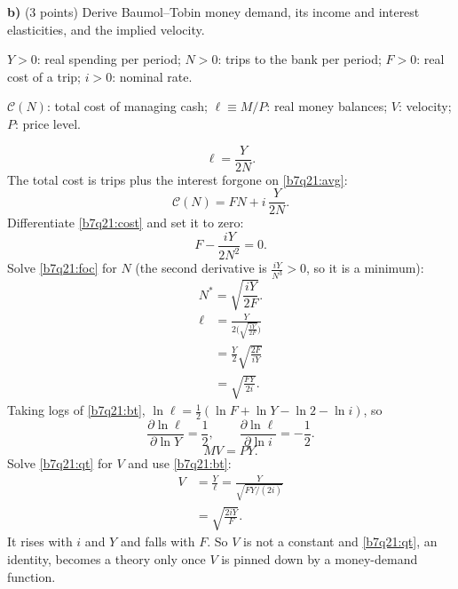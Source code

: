 \textbf{b)} (3 points) Derive Baumol--Tobin money demand, its income and interest elasticities, and the implied velocity.
\resolespaco
\begin{sol}
\begin{notacao}
\item $Y>0$: real spending per period; $N>0$: trips to the bank per period; $F>0$: real cost of a trip; $i>0$: nominal rate.
\item $\mathcal C(N)$: total cost of managing cash; $\ell\equiv M/P$: real money balances; $V$: velocity; $P$: price level.
\end{notacao}
\begin{equation}
\ell=\frac{Y}{2N}. \label{b7q21:avg}
\end{equation}
The total cost is trips plus the interest forgone on \eqref{b7q21:avg}:
\begin{equation}
\mathcal C(N)=FN+i\,\frac{Y}{2N}. \label{b7q21:cost}
\end{equation}
Differentiate \eqref{b7q21:cost} and set it to zero:
\begin{equation}
F-\frac{iY}{2N^2}=0. \label{b7q21:foc}
\end{equation}
Solve \eqref{b7q21:foc} for $N$ (the second derivative is $\frac{iY}{N^3}>0$, so it is a minimum):
\begin{equation}
N^\ast=\sqrt{\frac{iY}{2F}}. \label{b7q21:N}
\end{equation}
\begin{align}
\ell&=\frac{Y}{2\Big(\sqrt{\frac{iY}{2F}}\Big)}\nonumber\\
&=\frac Y2\sqrt{\frac{2F}{iY}}\nonumber\\
&=\sqrt{\frac{FY}{2i}}. \label{b7q21:bt}
\end{align}
Taking logs of \eqref{b7q21:bt}, $\ln\ell=\frac12(\ln F+\ln Y-\ln2-\ln i)$, so
\[
\frac{\partial\ln\ell}{\partial\ln Y}=\frac12,\qquad \frac{\partial\ln\ell}{\partial\ln i}=-\frac12 .
\]
\begin{equation}
MV=PY. \label{b7q21:qt}
\end{equation}
Solve \eqref{b7q21:qt} for $V$ and use \eqref{b7q21:bt}:
\begin{align}
V&=\frac{Y}{\ell}=\frac{Y}{\sqrt{FY/(2i)}}\nonumber\\
&=\sqrt{\frac{2iY}{F}}. \label{b7q21:V}
\end{align}
It rises with $i$ and $Y$ and falls with $F$. So $V$ is not a constant and \eqref{b7q21:qt}, an identity, becomes a theory only once
$V$ is pinned down by a money-demand function.
\end{sol}


